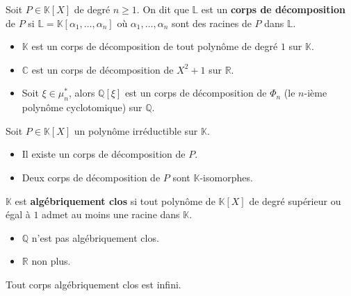 	\begin{definition}
		Soit $P \in \mathbb{K}[X]$ de degré $n \geq 1$. On dit que $\mathbb{L}$ est un \textbf{corps de décomposition} de $P$ si $\mathbb{L} = \mathbb{K}[\alpha_1, \dots, \alpha_n]$ où $\alpha_1, \dots, \alpha_n$ sont des racines de $P$ dans $\mathbb{L}$.
	\end{definition}

	\begin{example}
		\begin{itemize}
			\item $\mathbb{K}$ est un corps de décomposition de tout polynôme de degré $1$ sur $\mathbb{K}$.
			\item $\mathbb{C}$ est un corps de décomposition de $X^2+1$ sur $\mathbb{R}$.
			\item Soit $\xi \in \mu_n^*$, alors $\mathbb{Q}[\xi]$ est un corps de décomposition de $\Phi_n$ (le $n$-ième polynôme cyclotomique) sur $\mathbb{Q}$.
		\end{itemize}
	\end{example}

	\begin{theorem}
		Soit $P \in \mathbb{K}[X]$ un polynôme irréductible sur $\mathbb{K}$.
		\begin{itemize}
			\item Il existe un corps de décomposition de $P$.
			\item Deux corps de décomposition de $P$ sont $\mathbb{K}$-isomorphes.
		\end{itemize}
	\end{theorem}

	\begin{definition}
		$\mathbb{K}$ est \textbf{algébriquement clos} si tout polynôme de $\mathbb{K}[X]$ de degré supérieur ou égal à $1$ admet au moins une racine dans $\mathbb{K}$.
	\end{definition}

	\begin{example}
		\begin{itemize}
			\item $\mathbb{Q}$ n'est pas algébriquement clos.
			\item $\mathbb{R}$ non plus.
		\end{itemize}
	\end{example}

	\begin{proposition}
		Tout corps algébriquement clos est infini.
	\end{proposition}

